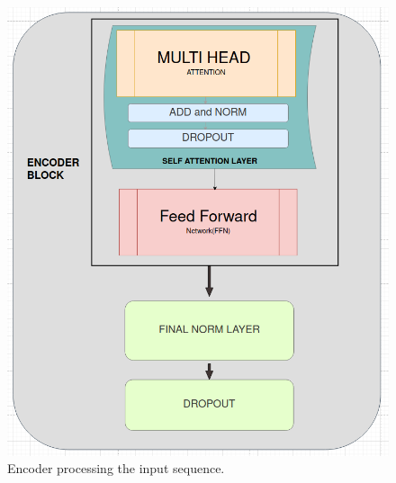 \documentclass{article}
\begin{document}
\begin{figure}[H]
  \centering
  \includegraphics[width=\textwidth]{./figures/encoder.png}
  \caption{Encoder processing the input sequence.}
  \label{fig:encoder}
\end{figure}
\end{document}
